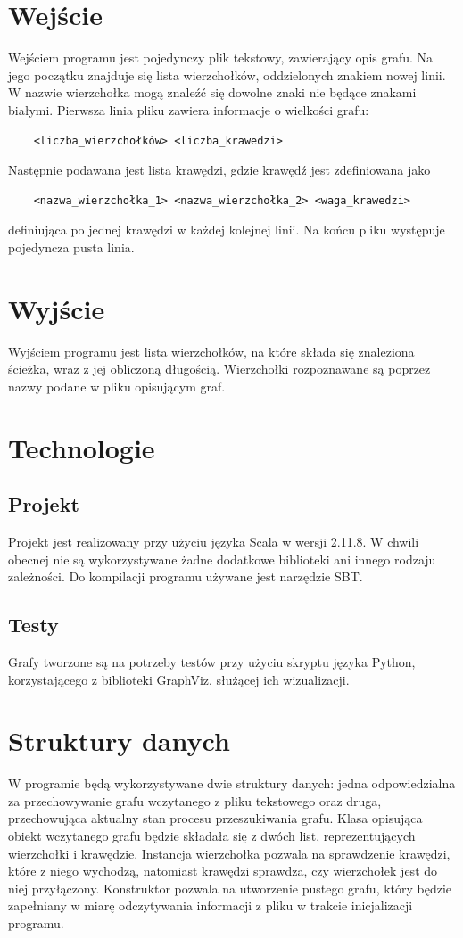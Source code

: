 \documentclass[a4paper, 12pt]{article}
\begin{document}
	\section{Wejście}
	Wejściem programu jest pojedynczy plik tekstowy, zawierający opis grafu.
	Na jego początku znajduje się lista wierzchołków, oddzielonych znakiem nowej linii. W nazwie wierzchołka mogą znaleźć się dowolne znaki nie będące znakami białymi.
	Pierwsza linia pliku zawiera informacje o wielkości grafu:
	\begin{verbatim}
	<liczba_wierzchołków> <liczba_krawedzi>
	\end{verbatim}
	Następnie podawana jest lista krawędzi, gdzie krawędź jest zdefiniowana jako
	\begin{verbatim}
	<nazwa_wierzchołka_1> <nazwa_wierzchołka_2> <waga_krawedzi>
	\end{verbatim}
	definiująca po jednej krawędzi w każdej kolejnej linii.
	Na końcu pliku występuje pojedyncza pusta linia.
	
	
	\section{Wyjście}
	Wyjściem programu jest lista wierzchołków, na które składa się znaleziona ścieżka, wraz z jej obliczoną długością. Wierzchołki rozpoznawane są poprzez nazwy podane w pliku opisującym graf.
	
	\section{Technologie} 
	\subsection{Projekt}
	Projekt jest realizowany przy użyciu języka Scala w wersji 2.11.8. W chwili obecnej nie są wykorzystywane żadne dodatkowe biblioteki ani innego rodzaju zależności. Do kompilacji programu używane jest narzędzie SBT.
	\subsection{Testy}
	Grafy tworzone są na potrzeby testów przy użyciu skryptu języka Python, korzystającego z biblioteki GraphViz, służącej ich wizualizacji.
	\section{Struktury danych}
	W programie będą wykorzystywane dwie struktury danych: jedna odpowiedzialna za przechowywanie grafu wczytanego z pliku tekstowego oraz druga, przechowująca aktualny stan procesu przeszukiwania grafu.
	Klasa opisująca obiekt wczytanego grafu będzie składała się z dwóch list, reprezentujących wierzchołki i krawędzie. Instancja wierzchołka pozwala na sprawdzenie krawędzi, które z niego wychodzą, natomiast krawędzi sprawdza, czy wierzchołek jest do niej przyłączony.
	Konstruktor pozwala na utworzenie pustego grafu, który będzie zapełniany w miarę odczytywania informacji z pliku w trakcie inicjalizacji programu.
	
\end{document}
